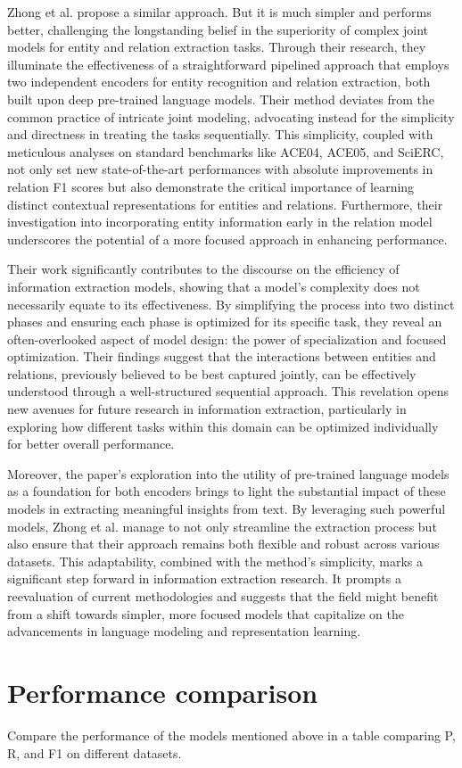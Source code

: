 Zhong et al. \cite{Zhong2020AFE} propose a similar approach. But it is much simpler and performs better, challenging the longstanding belief in the superiority of complex joint models for entity and relation extraction tasks. Through their research, they illuminate the effectiveness of a straightforward pipelined approach that employs two independent encoders for entity recognition and relation extraction, both built upon deep pre-trained language models. Their method deviates from the common practice of intricate joint modeling, advocating instead for the simplicity and directness in treating the tasks sequentially. This simplicity, coupled with meticulous analyses on standard benchmarks like ACE04, ACE05, and SciERC, not only set new state-of-the-art performances with absolute improvements in relation F1 scores but also demonstrate the critical importance of learning distinct contextual representations for entities and relations. Furthermore, their investigation into incorporating entity information early in the relation model underscores the potential of a more focused approach in enhancing performance.

Their work significantly contributes to the discourse on the efficiency of information extraction models, showing that a model's complexity does not necessarily equate to its effectiveness. By simplifying the process into two distinct phases and ensuring each phase is optimized for its specific task, they reveal an often-overlooked aspect of model design: the power of specialization and focused optimization. Their findings suggest that the interactions between entities and relations, previously believed to be best captured jointly, can be effectively understood through a well-structured sequential approach. This revelation opens new avenues for future research in information extraction, particularly in exploring how different tasks within this domain can be optimized individually for better overall performance.

Moreover, the paper's exploration into the utility of pre-trained language models as a foundation for both encoders brings to light the substantial impact of these models in extracting meaningful insights from text. By leveraging such powerful models, Zhong et al. manage to not only streamline the extraction process but also ensure that their approach remains both flexible and robust across various datasets. This adaptability, combined with the method's simplicity, marks a significant step forward in information extraction research. It prompts a reevaluation of current methodologies and suggests that the field might benefit from a shift towards simpler, more focused models that capitalize on the advancements in language modeling and representation learning.

\section{Performance comparison}
Compare the performance of the models mentioned above in a table comparing P, R, and F1 on different datasets.